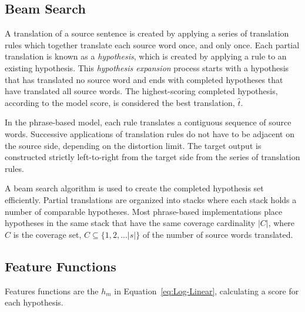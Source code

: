 \documentclass[11pt]{article}
\begin{document}
\subsection{Beam Search}

A translation of a source sentence is created by applying a series of translation rules which together translate each source word once, and only once. Each partial translation is known as a \emph{hypothesis}, which is created by applying a rule to an existing hypothesis. This \emph{hypothesis expansion} process starts with a hypothesis that has translated no source word and ends with completed hypotheses that have translated all source words. The highest-scoring completed hypothesis, according to the model score, is considered the best translation, $\hat{t} $.

In the phrase-based model, each rule translates a contiguous sequence of source words. Successive applications of translation rules do not have to be adjacent on the source side, depending on the distortion limit. The target output is constructed strictly left-to-right from the target side from the series of translation rules. 

A beam search algorithm is used to create the completed hypothesis set efficiently. Partial translations are organized into stacks where each stack holds a number of comparable hypotheses. Most phrase-based implementations place hypotheses in the same stack that have the same coverage cardinality $|C|$, where $C$ is  the coverage set, $C \subseteq \{1,2,... |s| \} $ of the number of  source words translated. 

\subsection{Feature Functions}

Features functions are the $h_m$ in Equation~\ref{eq:Log-Linear}, calculating a score for each hypothesis.
\end{document}
